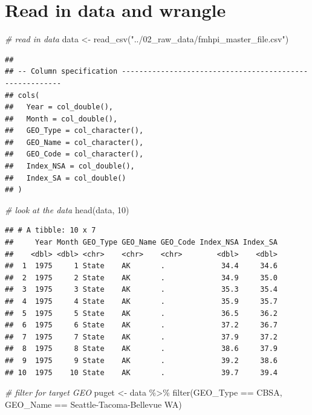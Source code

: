 \documentclass[
]{article}
\newenvironment{Shaded}{\begin{snugshade}}{\end{snugshade}}
\newcommand{\CommentTok}[1]{\textcolor[rgb]{0.56,0.35,0.01}{\textit{#1}}}
\newcommand{\DecValTok}[1]{\textcolor[rgb]{0.00,0.00,0.81}{#1}}
\newcommand{\FunctionTok}[1]{\textcolor[rgb]{0.00,0.00,0.00}{#1}}
\newcommand{\NormalTok}[1]{#1}
\newcommand{\OtherTok}[1]{\textcolor[rgb]{0.56,0.35,0.01}{#1}}
\newcommand{\SpecialCharTok}[1]{\textcolor[rgb]{0.00,0.00,0.00}{#1}}
\newcommand{\StringTok}[1]{\textcolor[rgb]{0.31,0.60,0.02}{#1}}
\begin{document}
\hypertarget{read-in-data-and-wrangle}{%
\section{Read in data and wrangle}\label{read-in-data-and-wrangle}}

\begin{Shaded}
\begin{Highlighting}[]
\CommentTok{\# read in data}
\NormalTok{data }\OtherTok{\textless{}{-}} \FunctionTok{read\_csv}\NormalTok{(}\StringTok{"../02\_raw\_data/fmhpi\_master\_file.csv"}\NormalTok{)}
\end{Highlighting}
\end{Shaded}

\begin{verbatim}
## 
## -- Column specification --------------------------------------------------------
## cols(
##   Year = col_double(),
##   Month = col_double(),
##   GEO_Type = col_character(),
##   GEO_Name = col_character(),
##   GEO_Code = col_character(),
##   Index_NSA = col_double(),
##   Index_SA = col_double()
## )
\end{verbatim}

\begin{Shaded}
\begin{Highlighting}[]
\CommentTok{\# look at the data}
\FunctionTok{head}\NormalTok{(data, }\DecValTok{10}\NormalTok{)}
\end{Highlighting}
\end{Shaded}

\begin{verbatim}
## # A tibble: 10 x 7
##     Year Month GEO_Type GEO_Name GEO_Code Index_NSA Index_SA
##    <dbl> <dbl> <chr>    <chr>    <chr>        <dbl>    <dbl>
##  1  1975     1 State    AK       .             34.4     34.6
##  2  1975     2 State    AK       .             34.9     35.0
##  3  1975     3 State    AK       .             35.3     35.4
##  4  1975     4 State    AK       .             35.9     35.7
##  5  1975     5 State    AK       .             36.5     36.2
##  6  1975     6 State    AK       .             37.2     36.7
##  7  1975     7 State    AK       .             37.9     37.2
##  8  1975     8 State    AK       .             38.6     37.9
##  9  1975     9 State    AK       .             39.2     38.6
## 10  1975    10 State    AK       .             39.7     39.4
\end{verbatim}

\begin{Shaded}
\begin{Highlighting}[]
\CommentTok{\# filter for target GEO}
\NormalTok{puget }\OtherTok{\textless{}{-}}\NormalTok{ data }\SpecialCharTok{\%\textgreater{}\%} 
  \FunctionTok{filter}\NormalTok{(GEO\_Type }\SpecialCharTok{==} \StringTok{\textquotesingle{}CBSA\textquotesingle{}}\NormalTok{, GEO\_Name }\SpecialCharTok{==} \StringTok{\textquotesingle{}Seattle{-}Tacoma{-}Bellevue WA\textquotesingle{}}\NormalTok{)}
\end{Highlighting}
\end{Shaded}
\end{document}
